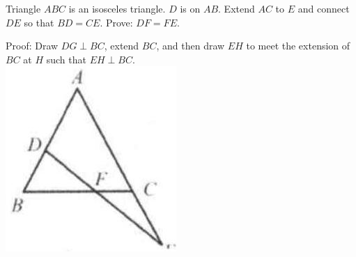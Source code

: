 \documentclass{article}
\begin{document}
Triangle \(A B C\) is an isosceles triangle. \(D\) is on \(A B\). Extend \(A C\) to \(E\) and connect \(D E\) so that \(B D=C E\). Prove: \(D F=F E\).

Proof:
Draw \(D G \perp B C\), extend \(B C\), and then draw \(E H\) to meet the extension of \(B C\) at \(H\) such that \(E H \perp B C\).\\
\centering
\includegraphics[width=\textwidth]{images/084(3).jpg}
\end{document}
